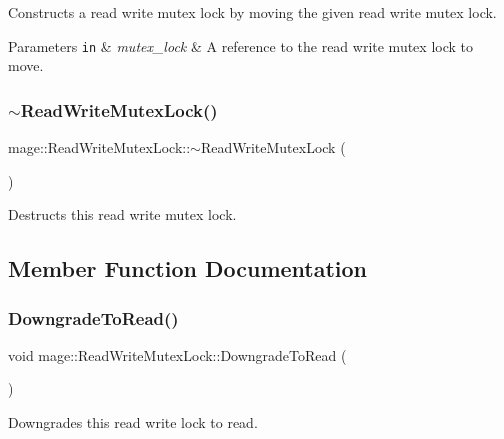 Constructs a read write mutex lock by moving the given read write mutex lock.


\begin{DoxyParams}[1]{Parameters}
\mbox{\tt in}  & {\em mutex\+\_\+lock} & A reference to the read write mutex lock to move. \\
\hline
\end{DoxyParams}
\hypertarget{structmage_1_1_read_write_mutex_lock_a64b600234d29ba7307fcd77a17486582}{}\label{structmage_1_1_read_write_mutex_lock_a64b600234d29ba7307fcd77a17486582} 
\subsubsection{\texorpdfstring{$\sim$\+Read\+Write\+Mutex\+Lock()}{~ReadWriteMutexLock()}}
{\footnotesize\ttfamily mage\+::\+Read\+Write\+Mutex\+Lock\+::$\sim$\+Read\+Write\+Mutex\+Lock (\begin{DoxyParamCaption}{ }\end{DoxyParamCaption})}

Destructs this read write mutex lock. 

\subsection{Member Function Documentation}
\hypertarget{structmage_1_1_read_write_mutex_lock_ad3292e579d09107c7361989657b9bade}{}\label{structmage_1_1_read_write_mutex_lock_ad3292e579d09107c7361989657b9bade} 
\subsubsection{\texorpdfstring{Downgrade\+To\+Read()}{DowngradeToRead()}}
{\footnotesize\ttfamily void mage\+::\+Read\+Write\+Mutex\+Lock\+::\+Downgrade\+To\+Read (\begin{DoxyParamCaption}{ }\end{DoxyParamCaption})}

Downgrades this read write lock to read. \hypertarget{structmage_1_1_read_write_mutex_lock_ade82a57f337e39a1515f67fbc1f6fc43}{}\label{structmage_1_1_read_write_mutex_lock_ade82a57f337e39a1515f67fbc1f6fc43} 
